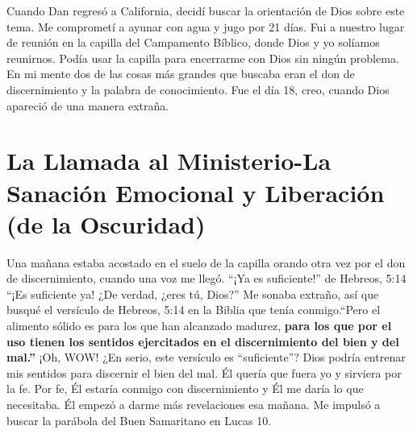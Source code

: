 \documentclass[twoside, 12pt]{book}
\begin{document}
Cuando Dan regresó a California, decidí buscar la orientación de Dios sobre este tema. Me comprometí a ayunar con agua y jugo por 21 días. Fui a nuestro lugar de reunión en la capilla del Campamento Bíblico, donde Dios y yo solíamos reunirnos. Podía usar la capilla para encerrarme con Dios sin ningún problema. En mi mente dos de las cosas más grandes que buscaba eran el don de discernimiento y la palabra de conocimiento. Fue el día 18, creo, cuando Dios apareció de una manera extraña.\\

\section{La Llamada al Ministerio-La Sanación Emocional y Liberación (de la Oscuridad)} 

Una mañana estaba acostado en el suelo de la capilla orando otra vez por el don de discernimiento, cuando una voz me llegó. “¡Ya es suficiente!” de Hebreos, 5:14 “¡Es suficiente ya! ¿De verdad, ¿eres tú, Dios?”  Me sonaba extraño, así que busqué el versículo de Hebreos, 5:14 en la Biblia que tenía conmigo.“Pero el alimento sólido es para los que han alcanzado madurez, \textbf{para los que por el uso tienen los sentidos ejercitados en el discernimiento del bien y del mal.”} ¡Oh, WOW! ¿En serio, este versículo es “suficiente”?  Dios podría entrenar mis sentidos para discernir el bien del mal. Él quería que fuera yo y sirviera por la fe. Por fe, Él estaría conmigo con discernimiento y Él me daría lo que necesitaba. Él empezó a darme más revelaciones esa mañana. Me impulsó a buscar la parábola del Buen Samaritano en Lucas 10.\\
 
\end{document}
